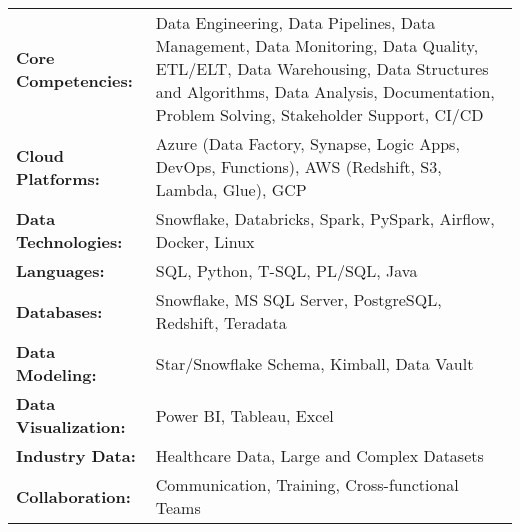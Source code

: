 \begin{onecolentry}
    \begin{tabularx}{\linewidth}{l X}
        \textbf{Core Competencies:} & Data Engineering, Data Pipelines, Data Management, Data Monitoring, Data Quality, ETL/ELT, Data Warehousing, Data Structures and Algorithms, Data Analysis, Documentation, Problem Solving, Stakeholder Support, CI/CD \\
        \textbf{Cloud Platforms:} & Azure (Data Factory, Synapse, Logic Apps, DevOps, Functions), AWS (Redshift, S3, Lambda, Glue), GCP \\
        \textbf{Data Technologies:} & Snowflake, Databricks, Spark, PySpark, Airflow, Docker, Linux \\
        \textbf{Languages:} & SQL, Python, T-SQL, PL/SQL, Java \\
        \textbf{Databases:} & Snowflake, MS SQL Server, PostgreSQL, Redshift, Teradata \\
        \textbf{Data Modeling:} & Star/Snowflake Schema, Kimball, Data Vault \\
        \textbf{Data Visualization:} & Power BI, Tableau, Excel \\
        \textbf{Industry Data:} & Healthcare Data, Large and Complex Datasets \\
        \textbf{Collaboration:} & Communication, Training, Cross-functional Teams \\
    \end{tabularx}
\end{onecolentry}